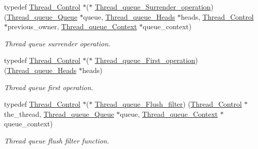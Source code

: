 \begin{DoxyCompactItemize}
typedef \mbox{\hyperlink{struct__Thread__Control}{Thread\+\_\+\+Control}} $\ast$($\ast$ \mbox{\hyperlink{group__RTEMSScoreThreadQueue_ga42e805a4c313faaddf8dc08592696574}{Thread\+\_\+queue\+\_\+\+Surrender\+\_\+operation}}) (\mbox{\hyperlink{structThread__queue__Queue}{Thread\+\_\+queue\+\_\+\+Queue}} $\ast$queue, \mbox{\hyperlink{group__RTEMSScoreThreadQueue_gaebac32033b009cc8f606a90bd389f8e9}{Thread\+\_\+queue\+\_\+\+Heads}} $\ast$heads, \mbox{\hyperlink{struct__Thread__Control}{Thread\+\_\+\+Control}} $\ast$previous\+\_\+owner, \mbox{\hyperlink{structThread__queue__Context}{Thread\+\_\+queue\+\_\+\+Context}} $\ast$queue\+\_\+context)
\begin{DoxyCompactList}\small\item\em Thread queue surrender operation. \end{DoxyCompactList}\item 
typedef \mbox{\hyperlink{struct__Thread__Control}{Thread\+\_\+\+Control}} $\ast$($\ast$ \mbox{\hyperlink{group__RTEMSScoreThreadQueue_gacd3bee122e35cf14e0ed8680256db439}{Thread\+\_\+queue\+\_\+\+First\+\_\+operation}}) (\mbox{\hyperlink{group__RTEMSScoreThreadQueue_gaebac32033b009cc8f606a90bd389f8e9}{Thread\+\_\+queue\+\_\+\+Heads}} $\ast$heads)
\begin{DoxyCompactList}\small\item\em Thread queue first operation. \end{DoxyCompactList}\item 
typedef \mbox{\hyperlink{struct__Thread__Control}{Thread\+\_\+\+Control}} $\ast$($\ast$ \mbox{\hyperlink{group__RTEMSScoreThreadQueue_ga66aee78bfdca4bd829cdedf18e7c2451}{Thread\+\_\+queue\+\_\+\+Flush\+\_\+filter}}) (\mbox{\hyperlink{struct__Thread__Control}{Thread\+\_\+\+Control}} $\ast$the\+\_\+thread, \mbox{\hyperlink{structThread__queue__Queue}{Thread\+\_\+queue\+\_\+\+Queue}} $\ast$queue, \mbox{\hyperlink{structThread__queue__Context}{Thread\+\_\+queue\+\_\+\+Context}} $\ast$queue\+\_\+context)
\begin{DoxyCompactList}\small\item\em Thread queue flush filter function. \end{DoxyCompactList}\end{DoxyCompactItemize}
